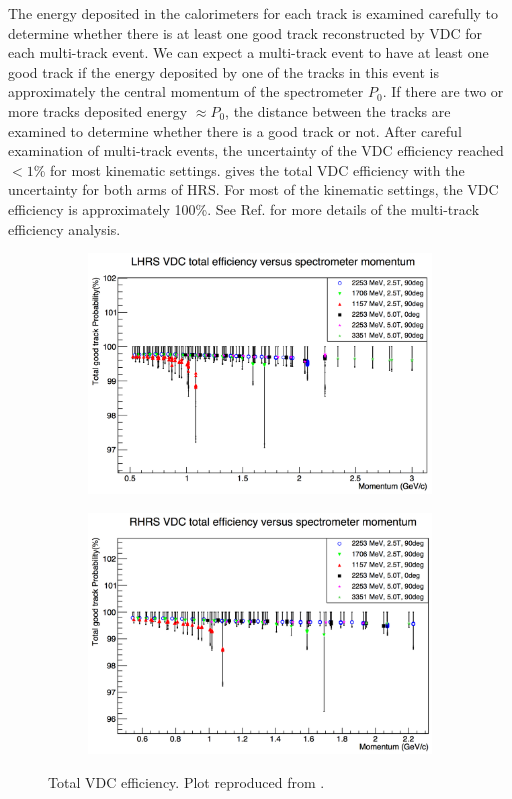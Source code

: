 The energy deposited in the calorimeters for each track is examined carefully to determine whether there is at least one good track reconstructed by VDC for each multi-track event. We can expect a multi-track event to have at least one good track if the energy deposited by one of the tracks in this event is approximately the central momentum of the spectrometer $P_0$. If there are two or more tracks deposited energy $\approx P_0$, the distance between the tracks are examined to determine whether there is a good track or not. After careful examination of multi-track events, the uncertainty of the VDC efficiency reached $<1$\% for most kinematic settings.  gives the total VDC efficiency with the uncertainty for both arms of HRS. For most of the kinematic settings, the VDC efficiency is approximately 100\%. See Ref. \cite{Liu2013} for more details of the multi-track efficiency analysis.

\begin{figure}[tb!]
  \centering
  \begin{subfigure}[t]{0.49\textwidth}
    \includegraphics[width=\textwidth]{figs/VDC-efficiency-left.png}
  \end{subfigure}
  \begin{subfigure}[t]{0.49\textwidth}
    \includegraphics[width=\textwidth]{figs/VDC-efficiency-right.png}
  \end{subfigure}
  \caption[Total VDC efficiency.]{Total VDC efficiency. Plot reproduced from \cite{Liu2013}. \label{C7S2SS1F2}}
\end{figure}

